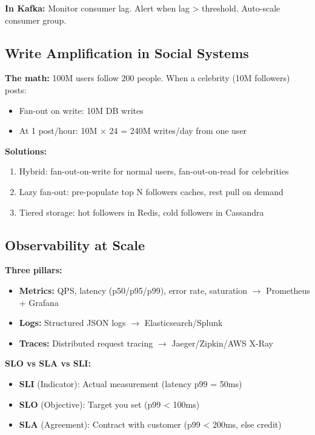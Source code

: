 \documentclass[11pt]{article}
\providecommand{\tightlist}{\setlength{\itemsep}{1pt}\setlength{\parskip}{0pt}}
\begin{document}
\textbf{In Kafka:} Monitor consumer lag. Alert when lag \textgreater{} threshold. Auto-scale consumer group.

\subsection{Write Amplification in Social Systems}\label{write-amplification-in-social-systems}

\textbf{The math:} 100M users follow 200 people. When a celebrity (10M followers) posts:

\begin{itemize}
\tightlist
\item
  Fan-out on write: 10M DB writes
\item
  At 1 post/hour: 10M \(\times\) 24 = 240M writes/day from one user
\end{itemize}

\textbf{Solutions:}

\begin{enumerate}
\def\labelenumi{\arabic{enumi}.}
\tightlist
\item
  Hybrid: fan-out-on-write for normal users, fan-out-on-read for celebrities
\item
  Lazy fan-out: pre-populate top N followers\textquotesingle{} caches, rest pull on demand
\item
  Tiered storage: hot followers in Redis, cold followers in Cassandra
\end{enumerate}

\subsection{Observability at Scale}\label{observability-at-scale}

\textbf{Three pillars:}

\begin{itemize}
\tightlist
\item
  \textbf{Metrics:} QPS, latency (p50/p95/p99), error rate, saturation \(\rightarrow\) Prometheus + Grafana
\item
  \textbf{Logs:} Structured JSON logs \(\rightarrow\) Elasticsearch/Splunk
\item
  \textbf{Traces:} Distributed request tracing \(\rightarrow\) Jaeger/Zipkin/AWS X-Ray
\end{itemize}

\textbf{SLO vs SLA vs SLI:}

\begin{itemize}
\tightlist
\item
  \textbf{SLI} (Indicator): Actual measurement (latency p99 = 50ms)
\item
  \textbf{SLO} (Objective): Target you set (p99 \textless{} 100ms)
\item
  \textbf{SLA} (Agreement): Contract with customer (p99 \textless{} 200ms, else credit)
\end{itemize}
\end{document}
